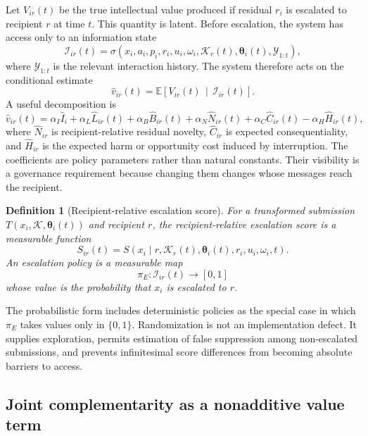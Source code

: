 \documentclass[11pt]{article}
\newtheorem{definition}{Definition}[section]
\theoremstyle{definition}
\newcommand{\E}{\mathbb{E}}
\newcommand{\K}{\mathcal{K}}
\newcommand{\thetaState}{\boldsymbol{\theta}}
\newcommand{\given}{\,\middle|\,}
\begin{document}
Let \(V_{ir}(t)\) be the true intellectual value produced if residual \(r_i\) is escalated to recipient \(r\) at time \(t\). This quantity is latent. Before escalation, the system has access only to an information state
\[
\mathscr{I}_{ir}(t)
=
\sigma\!\left(
x_i,
a_i,
p_i,
r_i,
u_i,
\omega_i,
\K_r(t),
\thetaState_i(t),
\mathcal{Y}_{1:t}
\right),
\]
where \(\mathcal{Y}_{1:t}\) is the relevant interaction history. The system therefore acts on the conditional estimate
\[
\widehat{v}_{ir}(t)
=
\E\!\left[
V_{ir}(t)
\given
\mathscr{I}_{ir}(t)
\right].
\]
A useful decomposition is
\[
\widehat{v}_{ir}(t)
=
\alpha_I \widehat{I}_i
+
\alpha_L \widehat{L}_{ir}(t)
+
\alpha_B \widehat{B}_{ir}(t)
+
\alpha_N \widehat{N}_{ir}(t)
+
\alpha_C \widehat{C}_{ir}(t)
-
\alpha_H \widehat{H}_{ir}(t),
\]
where \(\widehat{N}_{ir}\) is recipient-relative residual novelty, \(\widehat{C}_{ir}\) is expected consequentiality, and \(\widehat{H}_{ir}\) is the expected harm or opportunity cost induced by interruption. The coefficients are policy parameters rather than natural constants. Their visibility is a governance requirement because changing them changes whose messages reach the recipient.

\begin{definition}[Recipient-relative escalation score]
For a transformed submission \(T(x_i,\K,\thetaState_i(t))\) and recipient \(r\), the recipient-relative escalation score is a measurable function
\[
S_{ir}(t)
=
S\!\left(
x_i
\mid
r,
\K_r(t),
\thetaState_i(t),
r_i,
u_i,
\omega_i,
t
\right).
\]
An escalation policy is a measurable map
\[
\pi_E:
\mathscr{I}_{ir}(t)
\longrightarrow
[0,1]
\]
whose value is the probability that \(x_i\) is escalated to \(r\).
\end{definition}

The probabilistic form includes deterministic policies as the special case in which \(\pi_E\) takes values only in \(\{0,1\}\). Randomization is not an implementation defect. It supplies exploration, permits estimation of false suppression among non-escalated submissions, and prevents infinitesimal score differences from becoming absolute barriers to access.

\subsection{Joint complementarity as a nonadditive value term}
\end{document}
